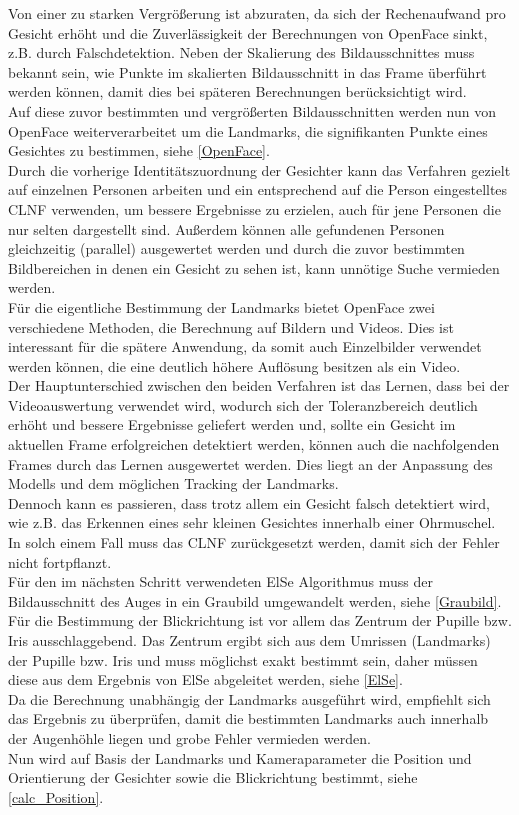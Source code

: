 Von einer zu starken Vergrößerung ist abzuraten, da sich der Rechenaufwand pro Gesicht erhöht und die Zuverlässigkeit der Berechnungen von OpenFace sinkt, z.B. durch Falschdetektion. Neben der Skalierung des Bildausschnittes muss bekannt sein, wie Punkte im skalierten Bildausschnitt in das Frame überführt werden können, damit dies bei späteren Berechnungen berücksichtigt wird.\\
Auf diese zuvor bestimmten und vergrößerten Bildausschnitten werden nun von OpenFace weiterverarbeitet um die Landmarks, die signifikanten Punkte eines Gesichtes zu bestimmen, siehe \autoref{OpenFace}.\\
Durch die vorherige Identitätszuordnung der Gesichter kann das Verfahren gezielt auf einzelnen Personen arbeiten und ein entsprechend auf die Person eingestelltes CLNF verwenden, um bessere Ergebnisse zu erzielen, auch für jene Personen die nur selten dargestellt sind. Außerdem können alle gefundenen Personen gleichzeitig (parallel) ausgewertet werden und durch die zuvor bestimmten Bildbereichen in denen ein Gesicht zu sehen ist, kann unnötige Suche vermieden werden.\\
Für die eigentliche Bestimmung der Landmarks bietet OpenFace zwei verschiedene Methoden, die Berechnung auf Bildern und Videos. Dies ist interessant für die spätere Anwendung, da somit auch Einzelbilder verwendet werden können, die eine deutlich höhere Auflösung besitzen als ein Video.\\
Der Hauptunterschied zwischen den beiden Verfahren ist das Lernen, dass bei der Videoauswertung verwendet wird, wodurch sich der Toleranzbereich deutlich erhöht und bessere Ergebnisse geliefert werden und, sollte ein Gesicht im aktuellen Frame erfolgreichen detektiert werden, können auch die nachfolgenden Frames durch das Lernen ausgewertet werden. Dies liegt an der Anpassung des Modells und dem möglichen Tracking der Landmarks.\\
Dennoch kann es passieren, dass trotz allem ein Gesicht falsch detektiert wird, wie z.B. das Erkennen eines sehr kleinen Gesichtes innerhalb einer Ohrmuschel. In solch einem Fall muss das CLNF zurückgesetzt werden, damit sich der Fehler nicht fortpflanzt.\\
Für den im nächsten Schritt verwendeten ElSe Algorithmus muss der Bildausschnitt des Auges in ein Graubild umgewandelt werden, siehe \autoref{Graubild}.\\
Für die Bestimmung der Blickrichtung ist vor allem das Zentrum der Pupille bzw. Iris ausschlaggebend. Das Zentrum ergibt sich aus dem Umrissen (Landmarks) der Pupille bzw. Iris und muss möglichst exakt bestimmt sein, daher müssen diese aus dem Ergebnis von ElSe abgeleitet werden, siehe \autoref{ElSe}.\\
Da die Berechnung unabhängig der Landmarks ausgeführt wird, empfiehlt sich das Ergebnis zu überprüfen, damit die bestimmten Landmarks auch innerhalb der Augenhöhle liegen und grobe Fehler vermieden werden.\\
Nun wird auf Basis der Landmarks und Kameraparameter die Position und Orientierung der Gesichter sowie die Blickrichtung bestimmt, siehe \autoref{calc_Position}.